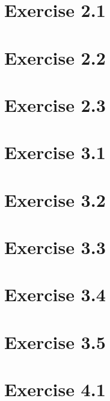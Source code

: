 \documentclass{article}
\begin{document}
\section{Exercise 2.1}
\section{Exercise 2.2}
\section{Exercise 2.3}

\section{Exercise 3.1}
\section{Exercise 3.2}
\section{Exercise 3.3}
\section{Exercise 3.4}
\section{Exercise 3.5}

\section{Exercise 4.1}
\end{document}
